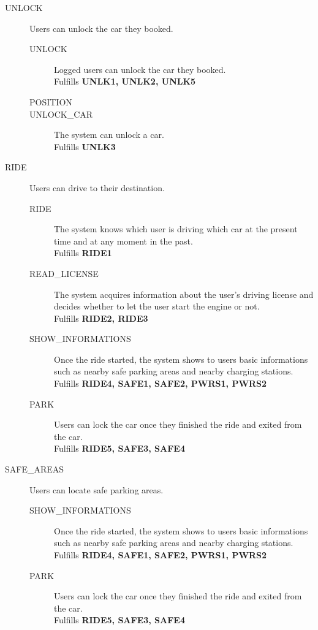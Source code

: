 \documentclass[11pt]{article} %
\begin{document}
\begin{description}
	\item[UNLOCK] Users can unlock the car they booked. \hfill {\color{red}{Missing UNLK4}}
		\begin{description}
			\item[UNLOCK] Logged users can unlock the car they booked. \\ Fulfills \textbf{UNLK1, UNLK2, UNLK5}
			\item[POSITION] {\color{red}{ The system must be able to locate the user. }}
			\item[UNLOCK\_CAR] The system can unlock a car. \\ Fulfills \textbf{UNLK3}
		\end{description}

	\item[RIDE] Users can drive to their destination. \hfill  {\color{red}{change RIDE def. Add PARK}}
		\begin{description}
			\item[RIDE] The system knows which user is driving which car at the present time and at any moment in the past. \\ Fulfills \textbf{RIDE1}
			\item[READ\_LICENSE] The system acquires information about the user's driving license and decides whether to let the user start the engine or not. \\ Fulfills \textbf{RIDE2, RIDE3}
			\item[SHOW\_INFORMATIONS] Once the ride started, the system shows to users basic informations such as nearby safe parking areas and nearby charging stations. \\ Fulfills \textbf{RIDE4, SAFE1, SAFE2, PWRS1, PWRS2}
			\item[PARK] Users can lock the car once they finished the ride and exited from the car. \\ Fulfills \textbf{RIDE5, SAFE3, SAFE4}
		\end{description}

	\item[SAFE\_AREAS] Users can locate safe parking areas. \hfill   {\color{red}{Overlaps with RIDE!}}
		\begin{description}
			\item[SHOW\_INFORMATIONS] Once the ride started, the system shows to users basic informations such as nearby safe parking areas and nearby charging stations. \\ Fulfills \textbf{RIDE4, SAFE1, SAFE2, PWRS1, PWRS2}
			\item[PARK] Users can lock the car once they finished the ride and exited from the car. \\ Fulfills \textbf{RIDE5, SAFE3, SAFE4}
		\end{description}


\end{description}
\end{document}
